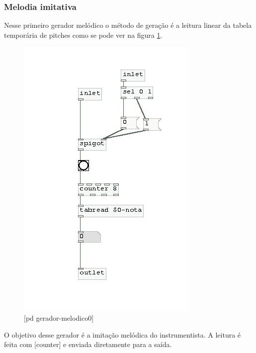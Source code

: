 \documentclass[draft]{ppgmus}
\begin{document}
\subsubsection{Melodia imitativa}

Nesse primeiro gerador melódico o método de geração
é a leitura linear da tabela temporária de pitches
como se pode ver na figura \ref{gera-melodico0}.


\begin{figure}
\includegraphics[scale=.6]{gera-melodico0}
\caption{[pd gerador-melodico0]}
\label{gera-melodico0}
\end{figure}  




O objetivo desse gerador é a imitação melódica
do instrumentista. A leitura é feita com [counter]
e enviada diretamente para a saída.
\end{document}
